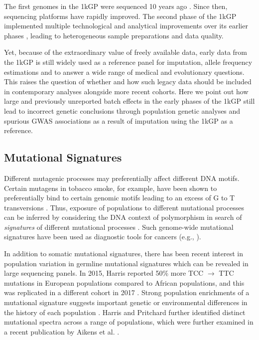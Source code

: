 \documentclass[custompaper]{MBE}%
\begin{document}
The first genomes in the 1kGP were sequenced 10 years ago \citep{VanDijk2014}. Since then, sequencing platforms have rapidly improved.  
The second phase of the 1kGP implemented multiple technological and analytical improvements over its earlier phases \citep{The1000GenomesProjectConsortium2012,phase3}, leading to heterogeneous sample preparations and data quality.

Yet, because of the extraordinary value of freely available data, early data from the 1kGP is still widely used as a reference panel for imputation, allele frequency estimations and to answer a wide range of medical and evolutionary questions.
This raises the question of whether and how such legacy data should be included in contemporary analyses alongside more recent cohorts.
Here we point out how large and previously unreported batch effects in the early phases of the 1kGP still lead to incorrect genetic conclusions through population genetic analyses and spurious GWAS associations as a result of imputation using the 1kGP as a reference.

\subsection{Mutational Signatures}

Different mutagenic processes may preferentially affect different DNA motifs. 
Certain mutagens in tobacco smoke, for example, have been shown to preferentially bind to certain genomic motifs leading to an excess of G to T transversions \citep{Pfeifer2002,Pleasance2010}. 
Thus, exposure of populations to different mutational processes can be inferred by considering the DNA context of polymorphism in search of \textit{signatures} of different mutational processes \citep{Alexandrov2013,Shiraishi2015a}. 
Such genome-wide mutational signatures have been used as diagnostic tools for cancers (e.g., \cite{Alexandrov2013,Shiraishi2015a}).

In addition to somatic mutational signatures, there has been recent interest in population variation in germline mutational signatures which can be revealed in large sequencing panels. 
In 2015, Harris reported 50\% more TCC ${\rightarrow}$ TTC mutations in European populations compared to African populations, and this was replicated in a different cohort in 2017 \citep{Harris2015a, Harris2017a, Mathieson2017a}. 
Strong population enrichments of a mutational signature suggests important genetic or environmental differences in the history of each population \citep{Harris2015a, Harris2017a}. 
Harris and Pritchard further identified distinct mutational spectra across a range of populations, which were further examined in a recent publication by Aikens et al. \citep{Harris2017a,Aikens2018}.
 
\end{document}
